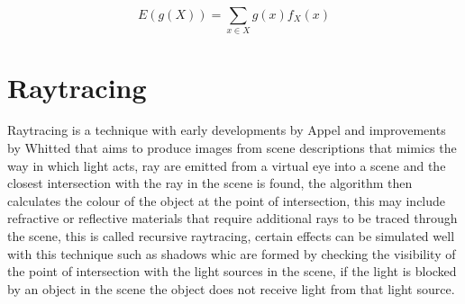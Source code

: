 \begin{equation}
E\left(g\left(X\right)\right) = \sum\limits_{x \in X} g\left(x\right)f_X\left(x\right)
\end{equation}

%


\section{Raytracing}
Raytracing is a technique with early developments by Appel \cite{Appel68} and improvements by Whitted \cite{whitted79a} that aims to produce images from scene descriptions that mimics the way
in which light acts, ray are emitted from a virtual eye into a scene and the closest intersection with the ray in the scene is
found, the algorithm then calculates the colour of the object at the point of intersection, this may include refractive or
reflective materials that require additional rays to be traced through the scene, this is called recursive raytracing, certain effects can be simulated well with this technique such as shadows whic are formed by checking the visibility
of the point of intersection with the light sources in the scene, if the light is blocked by an object in the scene
the object does not receive light from that light source.
